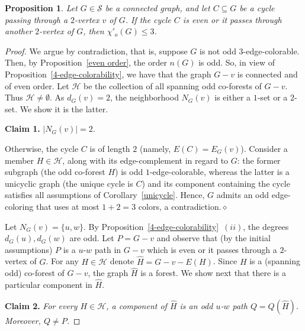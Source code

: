 \documentclass[a4paper,12pt]{article}
\newtheorem{proposition}[theorem]{Proposition}
\numberwithin{equation}{section}
\begin{document}
\begin{proposition}
    \label{sufficient condition 3-edge-colorability}
Let $G\in \mathcal{S}$ be a connected graph, and let $C\subseteq G$ be a cycle passing through a $2$-vertex $v$ of $G$. If the cycle $C$ is even or it passes through another $2$-vertex of $G$, then $\chi'_o(G)\leq 3$.
\end{proposition}
\begin{proof}
We argue by contradiction, that is, suppose $G$ is not odd $3$-edge-colorable. Then, by Proposition~\ref{even order}, the order $n(G)$ is odd. So, in view of Proposition~\ref{4-edge-colorability}, we have that the graph $G-v$ is connected and of even order. Let $\mathcal{H}$ be the collection of all spanning odd co-forests of $G-v$. Thus $\mathcal{H}\neq\emptyset$. As $d_G(v)=2$, the neighborhood $N_G(v)$ is either a $1$-set or a $2$-set. We show it is the latter.

\bigskip

\noindent \textbf{Claim 1.} $|N_G(v)|=2$.

\medskip

\noindent Otherwise, the cycle $C$ is of length $2$ (namely, $E(C)=E_G(v)$). Consider a member $H\in\mathcal{H}$, along with its edge-complement in regard to $G$: the former subgraph (the odd co-forest $H$) is odd $1$-edge-colorable, whereas the latter is a unicyclic graph (the unique cycle is $C$) and its component containing the cycle satisfies all assumptions of Corollary~\ref{unicycle}. Hence, $G$ admits an odd edge-coloring that uses at most $1+2=3$ colors, a contradiction.\hfill$\diamond$

\bigskip

Let $N_G(v)=\{u,w\}$. By Proposition~\ref{4-edge-colorability}~$(ii)$, the degrees $d_G(u),d_G(w)$ are odd. Let $P=G-v$ and observe that (by the initial assumptions) $P$ is a $u$-$w$ path in $G-v$ which is even or it passes through a $2$-vertex of $G$. For any $H\in\mathcal{H}$ denote $\hat{H}=G-v-E(H)$. Since $H$ is a (spanning odd) co-forest of $G-v$, the graph $\hat{H}$ is a forest. We show next that there is a particular component in $\hat{H}$.

\bigskip

\noindent \textbf{Claim 2.} \textit{For every $H\in\mathcal{H}$, a component of $\hat{H}$ is an odd $u$-$w$ path $Q=Q(\hat{H})$. Moreover, $Q\neq P$.}

\medskip


\end{proof}
\end{document}
